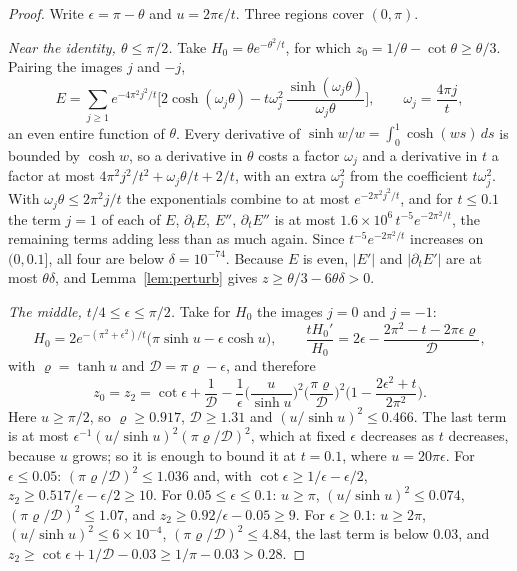 \begin{proof}
Write $\epsilon=\pi-\theta$ and $u=2\pi\epsilon/t$. Three regions cover $(0,\pi)$.

\emph{Near the identity, $\theta\le\pi/2$.} Take $H_0=\theta e^{-\theta^2/t}$, for which $z_0=1/\theta-\cot\theta\ge\theta/3$. Pairing the images $j$ and $-j$,
\[
E=\sum_{j\ge1}e^{-4\pi^2j^2/t}\Big[2\cosh(\omega_j\theta)-t\omega_j^2\,\frac{\sinh(\omega_j\theta)}{\omega_j\theta}\Big],\qquad \omega_j=\frac{4\pi j}{t},
\]
an even entire function of $\theta$. Every derivative of $\sinh w/w=\int_0^1\cosh(ws)\,ds$ is bounded by $\cosh w$, so a derivative in $\theta$ costs a factor $\omega_j$ and a derivative in $t$ a factor at most $4\pi^2j^2/t^2+\omega_j\theta/t+2/t$, with an extra $\omega_j^2$ from the coefficient $t\omega_j^2$. With $\omega_j\theta\le2\pi^2j/t$ the exponentials combine to at most $e^{-2\pi^2j^2/t}$, and for $t\le0.1$ the term $j=1$ of each of $E$, $\partial_tE$, $E''$, $\partial_tE''$ is at most $1.6\times10^6\,t^{-5}e^{-2\pi^2/t}$, the remaining terms adding less than as much again. Since $t^{-5}e^{-2\pi^2/t}$ increases on $(0,0.1]$, all four are below $\delta=10^{-74}$. Because $E$ is even, $|E'|$ and $|\partial_tE'|$ are at most $\theta\delta$, and Lemma~\ref{lem:perturb} gives $z\ge\theta/3-6\theta\delta>0$.

\emph{The middle, $t/4\le\epsilon\le\pi/2$.} Take for $H_0$ the images $j=0$ and $j=-1$:
\[
H_0=2e^{-(\pi^2+\epsilon^2)/t}\big(\pi\sinh u-\epsilon\cosh u\big),\qquad\frac{tH_0'}{H_0}=2\epsilon-\frac{2\pi^2-t-2\pi\epsilon\varrho}{\mathcal D},
\]
with $\varrho=\tanh u$ and $\mathcal D=\pi\varrho-\epsilon$, and therefore
\[
z_0=z_2=\cot\epsilon+\frac1{\mathcal D}-\frac1\epsilon\Big(\frac{u}{\sinh u}\Big)^2\Big(\frac{\pi\varrho}{\mathcal D}\Big)^2\Big(1-\frac{2\epsilon^2+t}{2\pi^2}\Big).
\]
Here $u\ge\pi/2$, so $\varrho\ge0.917$, $\mathcal D\ge1.31$ and $(u/\sinh u)^2\le0.466$. The last term is at most $\epsilon^{-1}(u/\sinh u)^2(\pi\varrho/\mathcal D)^2$, which at fixed $\epsilon$ decreases as $t$ decreases, because $u$ grows; so it is enough to bound it at $t=0.1$, where $u=20\pi\epsilon$. For $\epsilon\le0.05$: $(\pi\varrho/\mathcal D)^2\le1.036$ and, with $\cot\epsilon\ge1/\epsilon-\epsilon/2$, $z_2\ge0.517/\epsilon-\epsilon/2\ge10$. For $0.05\le\epsilon\le0.1$: $u\ge\pi$, $(u/\sinh u)^2\le0.074$, $(\pi\varrho/\mathcal D)^2\le1.07$, and $z_2\ge0.92/\epsilon-0.05\ge9$. For $\epsilon\ge0.1$: $u\ge2\pi$, $(u/\sinh u)^2\le6\times10^{-4}$, $(\pi\varrho/\mathcal D)^2\le4.84$, the last term is below $0.03$, and $z_2\ge\cot\epsilon+1/\mathcal D-0.03\ge1/\pi-0.03>0.28$.


\end{proof}
